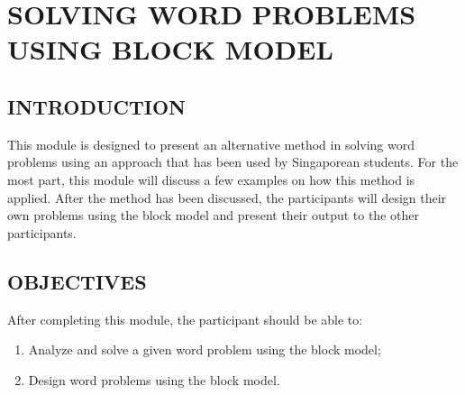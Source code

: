 \chapter[SOLVING WORD PROBLEMS USING\\ BLOCK MODEL]{SOLVING WORD PROBLEMS USING BLOCK MODEL}
\section*{INTRODUCTION}
This module is designed to present an alternative method in solving word problems using an
approach that has been used by Singaporean students. For the most part, this module will discuss a
few examples on how this method is applied. After the method has been discussed, the participants
will design their own problems using the block model and present their output to the other
participants.
\section*{OBJECTIVES}
After completing this module, the participant should be able to:
\begin{enumerate}
\item Analyze and solve a given word problem using the block model;
\item Design word problems using the block model.
\end{enumerate}

